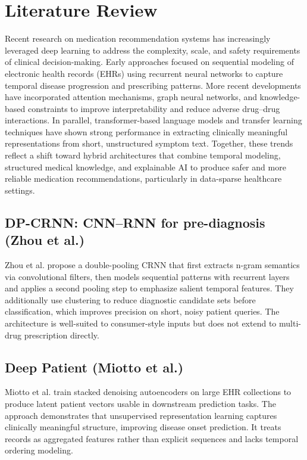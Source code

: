 \documentclass[conference,onecolumn]{IEEEtran}
\begin{document}
\section{Literature Review}

Recent research on medication recommendation systems has increasingly leveraged deep learning to address the complexity, scale, and safety requirements of clinical decision-making. Early approaches focused on sequential modeling of electronic health records (EHRs) using recurrent neural networks to capture temporal disease progression and prescribing patterns. More recent developments have incorporated attention mechanisms, graph neural networks, and knowledge-based constraints to improve interpretability and reduce adverse drug--drug interactions. In parallel, transformer-based language models and transfer learning techniques have shown strong performance in extracting clinically meaningful representations from short, unstructured symptom text. Together, these trends reflect a shift toward hybrid architectures that combine temporal modeling, structured medical knowledge, and explainable AI to produce safer and more reliable medication recommendations, particularly in data-sparse healthcare settings.


\subsection{DP-CRNN: CNN–RNN for pre-diagnosis (Zhou et al.)}
Zhou et al. propose a double-pooling CRNN that first extracts n-gram semantics via convolutional filters, then models sequential patterns with recurrent layers and applies a second pooling step to emphasize salient temporal features. They additionally use clustering to reduce diagnostic candidate sets before classification, which improves precision on short, noisy patient queries. The architecture is well-suited to consumer-style inputs but does not extend to multi-drug prescription directly.

\subsection{Deep Patient (Miotto et al.)}
Miotto et al. train stacked denoising autoencoders on large EHR collections to produce latent patient vectors usable in downstream prediction tasks. The approach demonstrates that unsupervised representation learning captures clinically meaningful structure, improving disease onset prediction. It treats records as aggregated features rather than explicit sequences and lacks temporal ordering modeling.
\end{document}
